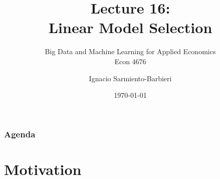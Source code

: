 \documentclass[
  shownotes,
  xcolor={svgnames},
  hyperref={colorlinks,citecolor=DarkBlue,linkcolor=DarkRed,urlcolor=DarkBlue}
  , aspectratio=169]{beamer}
\begin{document}
\title[Lecture 16]{Lecture 16: \\ Linear Model Selection}
\subtitle{Big Data and Machine Learning for Applied Economics \\ Econ 4676}
\date{\today}

\author[Sarmiento-Barbieri]{Ignacio Sarmiento-Barbieri}


\begin{frame}[noframenumbering]
\maketitle
\end{frame}





\begin{frame}
\frametitle{Agenda}

\tableofcontents

\end{frame}

\section{Motivation }
\end{document}
